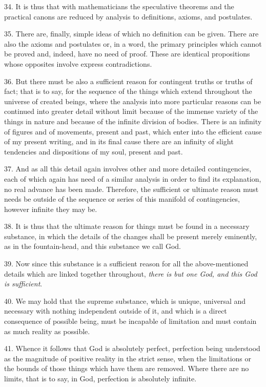 34. It is thus that with mathematicians the speculative theorems and
the practical canons are reduced by analysis to definitions, axioms,
and postulates.

35. There are, finally, simple ideas of which no definition can be
given. There are also the axioms and postulates or, in a word, the
primary principles which cannot be proved and, indeed, have no need of
proof. These are identical propositions whose opposites involve
express contradictions.

36. But there must be also a sufficient reason for contingent truths
or truths of fact; that is to say, for the sequence of the things
which extend throughout the universe of created beings, where the
analysis into more particular reasons can be continued into greater
detail without limit because of the immense variety of the things in
nature and because of the infinite division of bodies. There is an
infinity of figures and of movements, present and past, which enter
into the efficient cause of my present writing, and in its final cause
there are an infinity of slight tendencies and dispositions of my
soul, present and past.

37. And as all this detail again involves other and more
detailed contingencies, each of which again has need of a similar
analysis in order to find its explanation, no real advance has been
made. Therefore, the sufficient or ultimate reason must needs be
outside of the sequence or series of this manifold of contingencies,
however infinite they may be.

38. It is thus that the ultimate reason for things must be found in a
necessary substance, in which the details of the changes shall be
present merely eminently, as in the fountain-head, and this substance
we call God.

39. Now since this substance is a sufficient reason for all the
above-mentioned details which are linked together throughout,
\textit{there is but one God, and this God is sufficient}.

40. We may hold that the supreme substance, which is unique, universal
and necessary with nothing independent outside of it, and which is a
direct consequence of possible being, must be incapable of limitation
and must contain as much reality as possible.

41. Whence it follows that God is absolutely perfect, perfection being
understood as the magnitude of positive reality in the strict sense,
when the limitations or the bounds of those things which have them are
removed. Where there are no limits, that is to say, in God, perfection
is absolutely infinite.

